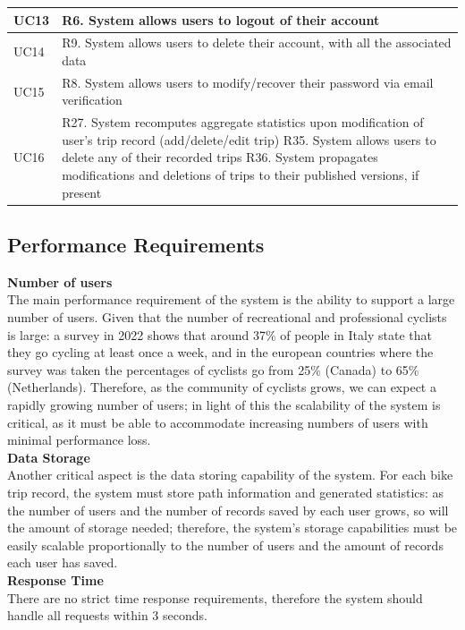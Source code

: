 \begin{longtable}{|p{3cm}|p{12cm}|}
   UC13 & 
   R6. System allows users to logout of their account \\ \hline
   UC14 & 
   R9. System allows users to delete their account, with all the associated data \\ \hline
   UC15 & 
   R8. System allows users to modify/recover their password via email verification \\ \hline
   UC16 &
   R27. System recomputes aggregate statistics upon modification of user’s trip record (add/delete/edit trip) \newline 
   R35. System allows users to delete any of their recorded trips \newline 
   R36. System propagates modifications and deletions of trips to their published versions, if present \\ \hline

\end{longtable}

\subsection{Performance Requirements}
\textbf{Number of users} \\
The main performance requirement of the system is the ability to support a large number 
of users. Given that the number of recreational and professional cyclists is large: a 
survey in 2022 shows that around 37\% of people in Italy state that they go cycling at 
least once a week, and in the european countries where the survey was taken the percentages 
of cyclists go from 25\% (Canada) to 65\% (Netherlands). Therefore, as the community of 
cyclists grows, we can expect a rapidly growing number of users; in light of this the 
scalability of the system is critical, as it must be able to accommodate increasing 
numbers of users with minimal performance loss. \\
\newline
\textbf{Data Storage} \\
Another critical aspect is the data storing capability of the system. For each bike trip 
record, the system must store path information and generated statistics: as the number 
of users and the number of records saved by each user grows, so will the amount of storage 
needed; therefore, the system’s storage capabilities must be easily scalable 
proportionally to the number of users and the amount of records each user has saved. \\
\newline
\textbf{Response Time} \\
There are no strict time response requirements, therefore the system should handle all 
requests within 3 seconds.


